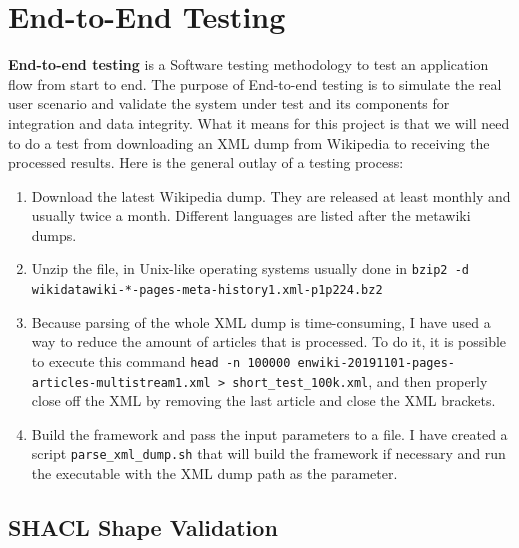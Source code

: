 \documentclass[thesis=M,english,hidelinks]{FITthesis}[2019/12/23]
\begin{document}
\section{End-to-End Testing}\label{end_to_end_testing}

\textbf{End-to-end testing} is a Software testing methodology to test an application flow from start to end. The purpose of End-to-end testing is to simulate the real user scenario and validate the system under test and its components for integration and data integrity. What it means for this project is that we will need to do a test from downloading an XML dump from Wikipedia to receiving the processed results. Here is the general outlay of a testing process:

\begin{enumerate}
	\item Download the latest Wikipedia dump\cite{wikimedia_downloads}. They are released at least monthly and usually twice a month. Different languages are listed after the metawiki dumps.
	\item Unzip the file, in Unix-like operating systems usually done in \lstinline{bzip2 -d wikidatawiki-*-pages-meta-history1.xml-p1p224.bz2} 
	\item [Optional] Because parsing of the whole XML dump is time-consuming, I have used a way to reduce the amount of articles that is processed. To do it, it is possible to execute this command \lstinline{head -n 100000 enwiki-20191101-pages-articles-multistream1.xml > short_test_100k.xml}, and then properly close off the XML by removing the last article and close the XML brackets.
	\item Build the framework and pass the input parameters to a file. I have created a script \lstinline{parse_xml_dump.sh} that will build the framework if necessary and run the executable with the XML dump path as the parameter.
\end{enumerate}


\subsection{SHACL Shape Validation}
\end{document}
